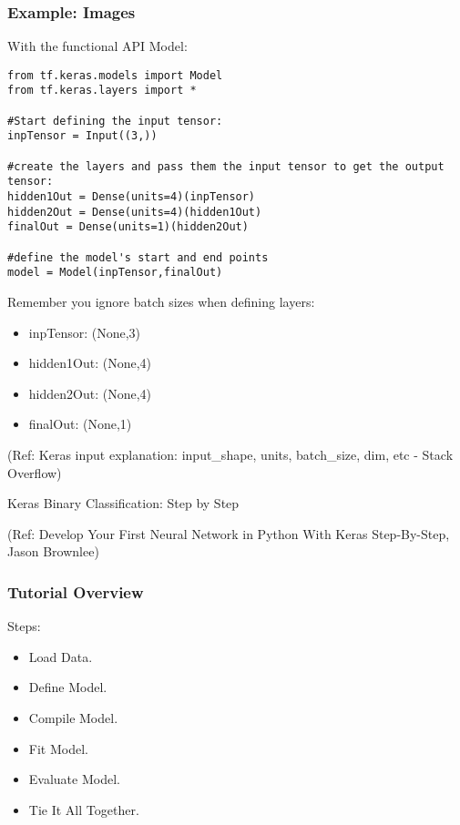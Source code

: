 \begin{frame}[fragile] \frametitle{Example: Images}

With the functional API Model:

\begin{lstlisting}
from tf.keras.models import Model   
from tf.keras.layers import * 

#Start defining the input tensor:
inpTensor = Input((3,))   

#create the layers and pass them the input tensor to get the output tensor:    
hidden1Out = Dense(units=4)(inpTensor)    
hidden2Out = Dense(units=4)(hidden1Out)    
finalOut = Dense(units=1)(hidden2Out)   

#define the model's start and end points    
model = Model(inpTensor,finalOut)  
\end{lstlisting}

Remember you ignore batch sizes when defining layers:

\begin{itemize}
\item  inpTensor: (None,3)
\item  hidden1Out: (None,4)
\item  hidden2Out: (None,4)
\item  finalOut: (None,1)
\end{itemize}


\tiny{(Ref: Keras input explanation: input\_shape, units, batch\_size, dim, etc - Stack Overflow)}
\end{frame}


\begin{frame}
  \begin{center}
    {\Large Keras Binary Classification: Step by Step}
    
    \tiny{(Ref:  Develop Your First Neural Network in Python With Keras Step-By-Step, Jason Brownlee)}
  \end{center}
\end{frame}

\begin{frame}[fragile] \frametitle{Tutorial Overview}
Steps:
\begin{itemize}
\item  Load Data.
\item  Define Model.
\item  Compile Model.
\item  Fit Model.
\item  Evaluate Model.
\item  Tie It All Together.

\end{itemize}
\end{frame}

